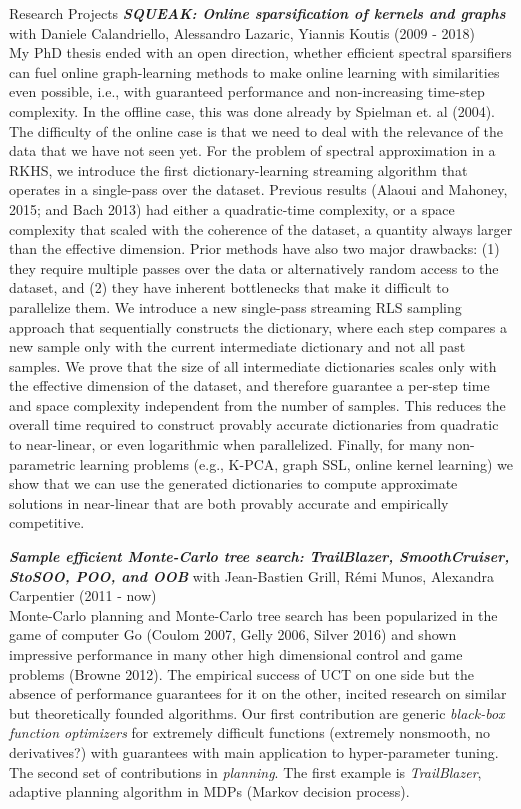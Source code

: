 \documentclass{resume}
\begin{document}
\begin{category}{Research Projects}
\citembullet \emph{\bf SQUEAK: Online sparsification of kernels and graphs} with Daniele Calandriello, Alessandro Lazaric, Yiannis Koutis (2009 - 2018)\\
 My PhD thesis ended with an open direction, whether efficient spectral sparsifiers can fuel online graph-learning methods to make online learning with similarities even possible, i.e., with guaranteed performance and non-increasing time-step complexity. In the offline case, this was done already by Spielman et. al (2004). The difficulty of the online case is that we need to deal with the relevance of the data that we have not seen yet.  For the problem of spectral approximation in a RKHS, we introduce the first dictionary-learning streaming algorithm that operates in a single-pass over the dataset. Previous results (Alaoui and Mahoney, 2015; and Bach 2013) had either a quadratic-time complexity, or a space complexity that scaled with the coherence of the dataset, a quantity always larger than the effective dimension. Prior methods have also two major drawbacks: (1) they require multiple passes over the data or alternatively random access to the dataset, and (2) they have inherent bottlenecks that make it difficult to parallelize them. We introduce a new single-pass streaming RLS sampling approach that sequentially constructs the dictionary, where each step compares a new sample only with the current intermediate dictionary and not all past samples. We prove that the size of all intermediate dictionaries scales only with the effective dimension of the dataset, and therefore guarantee a per-step time and space complexity independent from the number of samples. This reduces the overall time required to construct provably accurate dictionaries from quadratic to near-linear, or even logarithmic when parallelized. Finally, for many non-parametric learning problems (e.g., K-PCA, graph SSL, online kernel learning) we show that we can use the generated dictionaries to compute approximate solutions in near-linear that are both provably accurate and empirically competitive.


\citembullet \emph{\bf Sample efficient Monte-Carlo tree search: TrailBlazer, SmoothCruiser, StoSOO, POO, and OOB} with Jean-Bastien Grill, R\'emi Munos, 
Alexandra Carpentier (2011 - now)\\
Monte-Carlo planning and Monte-Carlo tree search has been popularized in the game of computer Go (Coulom 2007, Gelly 2006, Silver 2016) and shown impressive performance in many other high dimensional control and game problems (Browne 2012). The empirical success of UCT on one side but the absence of performance guarantees for it on the other, incited research on similar but theoretically founded algorithms. Our first contribution are generic \emph{black-box function optimizers} for extremely difficult functions (extremely nonsmooth, no derivatives?) with guarantees with main application to hyper-parameter tuning. The second set of contributions in \emph{planning}. The first example is \emph{TrailBlazer}, adaptive planning algorithm in MDPs (Markov decision process).



\end{category}
\end{document}
